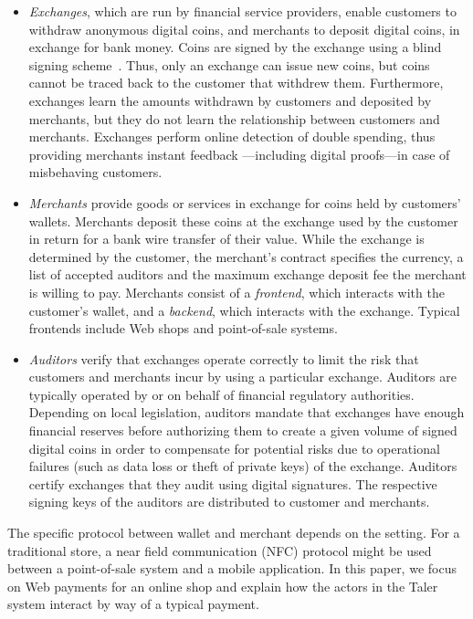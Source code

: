 \documentclass{llncs}
\begin{document}
\begin{itemize}
\item
{\em Exchanges}, which are run by financial service providers, enable
customers to withdraw anonymous digital coins,
and merchants to deposit digital coins, in exchange for
bank money.  Coins are signed by the exchange using
a blind signing scheme~\cite{chaum1983blind}.  Thus, only
an exchange can issue new coins, but coins cannot be traced back
to the customer that withdrew them.
Furthermore, exchanges learn the amounts withdrawn by customers
and deposited by merchants, but they do not learn the relationship
between customers and merchants.  Exchanges perform online detection
of double spending, thus providing merchants instant feedback
---including digital proofs---in case of misbehaving customers.

\item
{\em Merchants} provide goods or services in exchange for coins held
by customers' wallets.  Merchants deposit these coins at the
exchange used by the customer in return for a bank wire
transfer of their value.  While the exchange is determined by
the customer, the merchant's contract specifies the currency,
a list of accepted auditors and the maximum exchange deposit
fee the merchant is willing to pay.  Merchants consist of a
{\em frontend}, which interacts with the customer's wallet, and a {\em
backend}, which interacts with the exchange.  Typical frontends include
Web shops and point-of-sale systems.

\item
{\em Auditors} verify that exchanges operate correctly to limit the risk
that customers and merchants incur by using a particular exchange.
Auditors are typically operated by or on behalf of financial regulatory authorities.
Depending on local legislation, auditors mandate that exchanges
have enough financial reserves before authorizing them to create a given
volume of signed digital coins in order to compensate for potential risks due to
operational failures (such as data loss or theft of private keys) of the exchange.
Auditors certify exchanges that they audit using digital signatures.  The
respective signing keys of the auditors are distributed to customer and
merchants.
\end{itemize}


The specific protocol between wallet and merchant depends on the
setting.  For a traditional store, a near field communication (NFC)
protocol might be used between a point-of-sale system and a mobile
application.  In this paper, we focus on Web payments for an online
shop and explain how the actors in the Taler system interact by way of
a typical payment.
\end{document}
